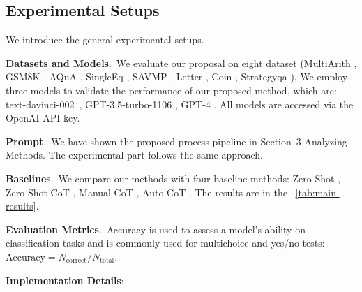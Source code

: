 \documentclass[11pt]{article}
\begin{document}
\phantom{Invisible Text}
\vspace{-\baselineskip}

\subsection{Experimental Setups}

\label{section4.1}
We introduce the general experimental setups.

\noindent
\textbf{Datasets and Models}.\, We evaluate our proposal on eight dataset (MultiArith \cite{roy2015solving}, GSM8K \cite{cobbe2021training}, AQuA \cite{ling2017program}, SingleEq \cite{koncel2015parsing}, SAVMP \cite{patel2021nlp}, Letter \cite{wei2022chain}, Coin \cite{wei2022chain}, Strategyqa \cite{geva2021did}). We employ three models to validate the performance of our proposed method, which are: text-davinci-002~\cite{brown2020language}, GPT-3.5-turbo-1106 \cite{ouyang2022training}, GPT-4 \cite{openai2023gpt}.  All models are accessed via the OpenAI API key.

\vspace{2pt}
\noindent
\textbf{Prompt}.\, We have shown the proposed process pipeline in Section~3 Analyzing Methods. The experimental part follows the same approach.

\vspace{2pt}
\noindent
\textbf{Baselines}.\, We compare our methods with four baseline methods: Zero-Shot \cite{kojima2023large}, Zero-Shot-CoT \cite{kojima2023large}, Manual-CoT \cite{wei2022chain}, Auto-CoT \cite{zhang2022automatic}. The results are in the ~\autoref{tab:main-results}.

\vspace{2pt}
\noindent
\textbf{Evaluation Metrics}.\,
Accuracy is used to assess a model's ability on classification tasks and is commonly used for multichoice and yes/no tests:
$
\text{Accuracy} = {N_{\text{correct}}}/{N_{\text{total}}}.
$

\vspace{2pt}
\noindent
\textbf{Implementation Details}:
\end{document}
